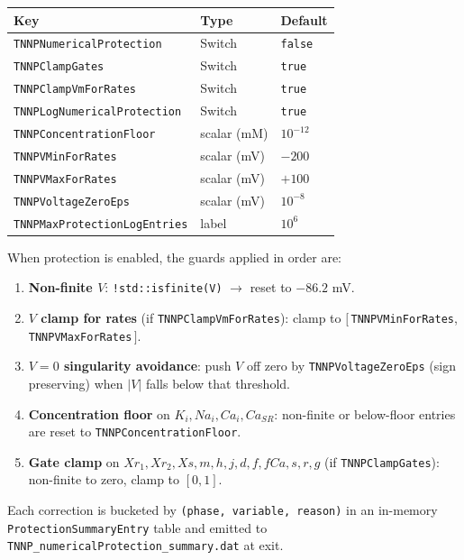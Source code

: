 \documentclass[11pt,a4paper]{article}
\newcommand{\code}[1]{\texttt{\small #1}}
\begin{document}
\begin{center}
\begin{tabular}{@{}lll@{}}
\toprule
Key & Type & Default \\
\midrule
\code{TNNPNumericalProtection} & Switch & \code{false} \\
\code{TNNPClampGates} & Switch & \code{true} \\
\code{TNNPClampVmForRates} & Switch & \code{true} \\
\code{TNNPLogNumericalProtection} & Switch & \code{true} \\
\code{TNNPConcentrationFloor} & scalar (mM) & $10^{-12}$ \\
\code{TNNPVMinForRates} & scalar (mV) & $-200$ \\
\code{TNNPVMaxForRates} & scalar (mV) & $+100$ \\
\code{TNNPVoltageZeroEps} & scalar (mV) & $10^{-8}$ \\
\code{TNNPMaxProtectionLogEntries} & label & $10^{6}$ \\
\bottomrule
\end{tabular}
\end{center}

When protection is enabled, the guards applied in order are:
\begin{enumerate}[topsep=0pt,itemsep=2pt]
  \item \textbf{Non-finite $V$}: \code{!std::isfinite(V)} $\rightarrow$
        reset to $-86.2$ mV.
  \item \textbf{$V$ clamp for rates} (if \code{TNNPClampVmForRates}):
        clamp to $[\,$\code{TNNPVMinForRates}, \code{TNNPVMaxForRates}$\,]$.
  \item \textbf{$V=0$ singularity avoidance}: push $V$ off zero by
        \code{TNNPVoltageZeroEps} (sign preserving) when
        $\lvert V \rvert$ falls below that threshold.
  \item \textbf{Concentration floor} on $K_{i}, Na_{i}, Ca_{i}, Ca_{SR}$:
        non-finite or below-floor entries are reset to
        \code{TNNPConcentrationFloor}.
  \item \textbf{Gate clamp} on $Xr_{1}, Xr_{2}, Xs, m, h, j, d, f, fCa,
        s, r, g$ (if \code{TNNPClampGates}): non-finite to zero,
        clamp to $[0, 1]$.
\end{enumerate}

Each correction is bucketed by \code{(phase, variable, reason)} in an
in-memory \code{ProtectionSummaryEntry} table and emitted to
\code{TNNP\_numericalProtection\_summary.dat} at exit.
\end{document}

